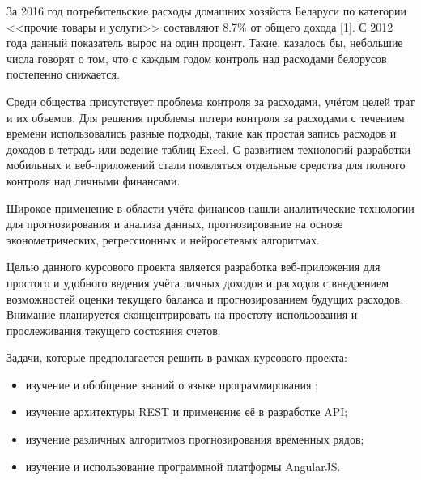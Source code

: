 
За 2016 год потребительские расходы домашних хозяйств Беларуси по категории
<<прочие товары и услуги>> составляют 8.7\% от общего дохода [1]. С 2012 года данный показатель
вырос на один процент. Такие, казалось бы, небольшие числа говорят о том, что с каждым годом
контроль над расходами белорусов постепенно снижается.

Среди общества присутствует проблема контроля за расходами, учётом целей трат и их
объемов. Для решения проблемы потери контроля за расходами с течением времени
использовались разные подходы, такие как простая запись расходов и доходов в тетрадь или
ведение таблиц Excel. С развитием технологий разработки мобильных и веб-приложений стали
появляться отдельные средства для полного контроля над личными финансами.

Широкое применение в области учёта финансов нашли аналитические технологии для прогнозирования
и анализа данных, прогнозирование на основе эконометрических, регрессионных и нейросетевых
алгоритмах.

Целью данного курсового проекта является разработка веб-приложения для простого и удобного
ведения учёта личных доходов и расходов с внедрением возможностей оценки текущего баланса
и прогнозированием будущих расходов. Внимание планируется сконцентрировать на простоту
использования и прослеживания текущего состояния счетов.

Задачи, которые предполагается решить в рамках курсового проекта:
\begin{itemize}
\item изучение и обобщение знаний о языке программирования \kt{};
\item изучение архитектуры REST и применение её в разработке API;
\item изучение различных алгоритмов прогнозирования временных \mbox{рядов};
\item изучение и использование программной платформы AngularJS.
\end{itemize}